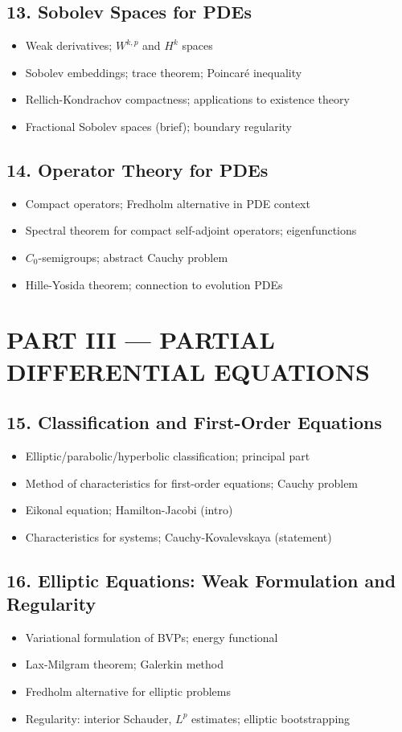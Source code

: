 \subsection{13. Sobolev Spaces for PDEs}
\begin{itemize}
\item Weak derivatives; $W^{k,p}$ and $H^k$ spaces
\item Sobolev embeddings; trace theorem; Poincar\'e inequality
\item Rellich-Kondrachov compactness; applications to existence theory
\item Fractional Sobolev spaces (brief); boundary regularity
\end{itemize}

\subsection{14. Operator Theory for PDEs}
\begin{itemize}
\item Compact operators; Fredholm alternative in PDE context
\item Spectral theorem for compact self-adjoint operators; eigenfunctions
\item $C_0$-semigroups; abstract Cauchy problem
\item Hille-Yosida theorem; connection to evolution PDEs
\end{itemize}

\section{PART III --- PARTIAL DIFFERENTIAL EQUATIONS}

\subsection{15. Classification and First-Order Equations}
\begin{itemize}
\item Elliptic/parabolic/hyperbolic classification; principal part
\item Method of characteristics for first-order equations; Cauchy problem
\item Eikonal equation; Hamilton-Jacobi (intro)
\item Characteristics for systems; Cauchy-Kovalevskaya (statement)
\end{itemize}

\subsection{16. Elliptic Equations: Weak Formulation and Regularity}
\begin{itemize}
\item Variational formulation of BVPs; energy functional
\item Lax-Milgram theorem; Galerkin method
\item Fredholm alternative for elliptic problems
\item Regularity: interior Schauder, $L^p$ estimates; elliptic bootstrapping
\end{itemize}

